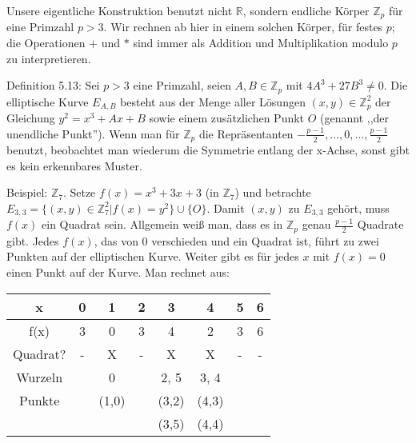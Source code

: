 \documentclass[a4paper]{article}
\begin{document}
\begin{multicols}{3}
        Unsere eigentliche Konstruktion benutzt nicht $\mathbb{R}$, sondern endliche Körper $\mathbb{Z}_p$ für eine Primzahl $p>3$. Wir rechnen ab hier in einem solchen Körper, für festes $p$; die Operationen $+$ und $*$ sind immer als Addition und Multiplikation modulo $p$ zu interpretieren.

        Definition 5.13: Sei $p >3$ eine Primzahl, seien $A,B\in\mathbb{Z}_p$ mit $4A^3+ 27B^3 \not= 0$. Die elliptische Kurve $E_{A,B}$ besteht aus der Menge aller Lösungen $(x,y)\in\mathbb{Z}^2_p$ der Gleichung $y^2=x^3+Ax+B$ sowie einem zusätzlichen Punkt $O$ (genannt ,,der unendliche Punkt'').
        Wenn man für $\mathbb{Z}_p$ die Repräsentanten $-\frac{p-1}{2},..., 0 , ...,\frac{p-1}{2}$ benutzt, beobachtet man wiederum die Symmetrie entlang der x-Achse, sonst gibt es kein erkennbares Muster.

        Beispiel: $\mathbb{Z}_7$. Setze $f(x)=x^3+ 3x+ 3$ (in $\mathbb{Z}_7$) und betrachte $E_{3,3}=\{(x,y)\in\mathbb{Z}^2_7 | f(x)=y^2\}\cup \{O\}$. Damit $(x,y)$ zu $E_{3,3}$ gehört, muss $f(x)$ ein Quadrat sein. Allgemein weiß man, dass es in $\mathbb{Z}_p$ genau $\frac{p-1}{2}$ Quadrate gibt. Jedes $f(x)$, das von $0$ verschieden und ein Quadrat ist, führt zu zwei Punkten auf der elliptischen Kurve. Weiter gibt es für jedes $x$ mit $f(x) = 0$ einen Punkt auf der Kurve. Man rechnet aus:

        \begin{tabular}{c|c|c|c|c|c|c|c}
         x    & 0  & 1   & 2  & 3   & 4   & 5  & 6  \\\hline
         f(x)   & 3  & 0   & 3  & 4   & 2   & 3  & 6  \\
         Quadrat? & -  & X   & -  & X   & X   & -  & -  \\
         Wurzeln &   & 0   &   & 2, 5 & 3, 4 &   \\
         Punkte  &   & (1,0) &   & (3,2) & (4,3) \\
             &   &    &   & (3,5) & (4,4)
        \end{tabular}


\end{multicols}
\end{document}
